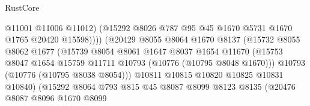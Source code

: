 \begin{lexlean}{RustCore}
\begin{coremodule}
                                        @11001
                                        @11006
                                        @11012)
                                      (@15292
                                        @8026
                                        @787
                                        @95
                                        @45
                                        @1670
                                        @5731
                                        @1670
                                        @1765
                                        @20420
                                        @15598))))
                                (@20429
                                  @8055
                                  @8064
                                  @1670
                                  @8137
                                  (@15732
                                    @8055
                                    @8062
                                    @1677
                                    (@15739
                                      @8054
                                      @8061
                                      @1647
                                      @8037
                                      @1654
                                      @11670
                                      (@15753
                                        @8047
                                        @1654
                                        @15759
                                        @11711
                                        @10793
                                        (@10776 (@10795 @8048 @1670)))
                                      @10793
                                      (@10776 (@10795 @8038 @8054)))
                                    @10811
                                    @10815
                                    @10820
                                    @10825
                                    @10831
                                    @10840)
                                  (@15292
                                    @8064
                                    @793
                                    @815
                                    @45
                                    @8087
                                    @8099
                                    @8123
                                    @8135
                                    (@20476
                                      @8087
                                      @8096
                                      @1670
                                      @8099

\end{coremodule}
\end{lexlean}
